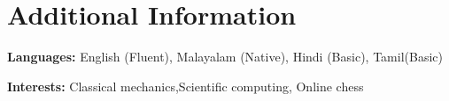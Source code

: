 \documentclass[a4paper,11pt]{article}
\begin{document}
	\section{\textbf{Additional Information}}
	\vspace{-0.4mm}
	\small{
		\textbf{Languages:} English (Fluent), Malayalam (Native), Hindi (Basic), Tamil(Basic)
		
		\textbf{Interests:} Classical mechanics,Scientific computing, Online chess
	}
	\vspace{-4mm}
	
	
%			
%			
	
\end{document}
